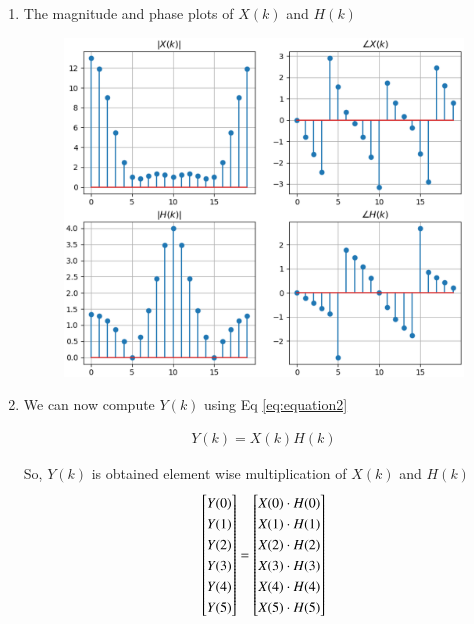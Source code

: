 \documentclass[journal,12pt,twocolumn]{IEEEtran}
\renewcommand\thesection{\arabic{section}}
\begin{document}
\begin{enumerate}[label=\thesection.\arabic*.,ref=\thesection.\theenumi]
\item The magnitude and phase plots of $X(k)$ and $H(k)$
\begin{figure}[!ht]
	\includegraphics[width=1.15\columnwidth]{./figs/ee18btech11017_fig1.eps}
\end{figure}

\item We can now compute $Y(k)$ using 	Eq \eqref{eq:equation2}

\begin{align}
    Y(k) = X(k)H(k)
    \label{eq:equation2}
\end{align}

So, $Y(k)$ is obtained element wise multiplication of $X(k)$ and $H(k)$
\begin{equation}
\renewcommand{\arraystretch}{1.25}
\setlength\arraycolsep{0.01pt}
\begin{bmatrix} 
Y(0) \\ Y(1) \\ Y(2) \\ Y(3) \\ Y(4) \\ Y(5) 
\end{bmatrix}
=
\begin{bmatrix}
X(0)\cdot H(0) \\ X(1)\cdot H(1) \\ X(2)\cdot H(2) \\ X(3)\cdot H(3) \\ X(4)\cdot H(4) \\ X(5)\cdot H(5)
\end{bmatrix}
\end{equation}


\end{enumerate}
\end{document}
